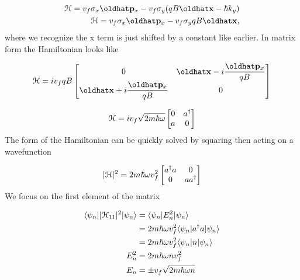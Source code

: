 \begin{align}
  \ham = v_f \sigma_x \op{p}_x - v_f \sigma_y (qB\op{x} - \hbar k_y) \nonumber \\
  \ham = v_f \sigma_x \op{p}_x - v_f \sigma_y qB\op{x},
\end{align}
where we recognize the x term is just shifted by a constant like earlier.
In matrix form the Hamiltonian looks like

\[
  \ham = i v_f q B
  \begin{bmatrix}
    0 & \op{x} - i\dfrac{\op{p}_x}{qB} \\
    \op{x} + i\dfrac{\op{p}_x}{qB} & 0
  \end{bmatrix}
\]

\[
  \mathcal{H} = i v_f \sqrt{2m \hbar\omega}
  \begin{bmatrix}
    0 & a^{\dagger}\\
    a & 0
  \end{bmatrix}
\]
The form of the Hamiltonian can be quickly solved by squaring then acting on a wavefunction

\[
  |\mathcal{H}|^2 = 2m \hbar\omega v_f^2
  \begin{bmatrix}
    a^{\dagger} a & 0 \\
    0 & aa^{\dagger}
  \end{bmatrix}
\]
We focus on the first element of the matrix

\begin{align}
  \langle \psi_n | |\mathcal{H}_{11}|^2 |\psi_n\rangle &= \langle \psi_n | E_n^2 |\psi_n\rangle \nonumber \\
    &= 2m \hbar\omega v_f^2 \langle \psi_n | a^{\dagger} a |\psi_n\rangle \nonumber \\
    &= 2m \hbar\omega v_f^2 \langle \psi_n | n |\psi_n\rangle \nonumber \\
    E_n^2 &= 2m \hbar \omega n v_f^2 \nonumber \\
    E_n &= \pm v_f \sqrt{2m\hbar\omega n}
\end{align}

